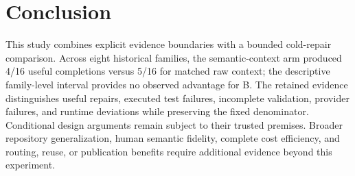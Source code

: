 \section{Conclusion}
\label{sec:conclusion}

This study combines explicit evidence boundaries with a bounded cold-repair
comparison. Across eight historical families, the semantic-context arm produced
4/16 useful completions versus 5/16 for matched raw context; the descriptive
family-level interval provides no observed advantage for B. The retained
evidence distinguishes useful repairs, executed test failures, incomplete
validation, provider failures, and runtime deviations while preserving the
fixed denominator. Conditional design arguments remain subject to their
trusted premises. Broader repository generalization, human semantic fidelity,
complete cost efficiency, and routing, reuse, or publication benefits require
additional evidence beyond this experiment.
